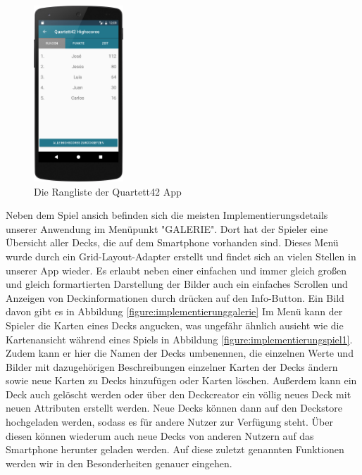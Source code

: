 \begin{figure}[htp]
	\centering
  	\includegraphics[width=0.3\textwidth]{img/screenshots/device_high_scores.png}
	\caption{Die Rangliste der Quartett42 App}
	\label{figure:implementierungrangliste}
\end{figure}

Neben dem Spiel ansich befinden sich die meisten Implementierungsdetails unserer Anwendung im Menüpunkt "GALERIE". Dort hat der Spieler eine Übersicht aller Decks, die auf dem Smartphone vorhanden sind. Dieses Menü wurde durch ein Grid-Layout-Adapter erstellt und findet sich an vielen Stellen in unserer App wieder. Es erlaubt neben einer einfachen und immer gleich großen und gleich formartierten Darstellung der Bilder auch ein einfaches Scrollen und Anzeigen von Deckinformationen durch drücken auf den Info-Button. Ein Bild davon gibt es in Abbildung \ref{figure:implementierunggalerie} Im Menü kann der Spieler die Karten eines Decks angucken, was ungefähr ähnlich ausieht wie die Kartenansicht während eines Spiels in Abbildung \ref{figure:implementierungspiel1}. Zudem kann er hier die Namen der Decks umbenennen, die einzelnen Werte und Bilder mit dazugehörigen Beschreibungen einzelner Karten der Decks ändern sowie neue Karten zu Decks hinzufügen oder Karten löschen. Außerdem kann ein Deck auch gelöscht werden oder über den Deckcreator ein völlig neues Deck mit neuen Attributen erstellt werden. Neue Decks können dann auf den Deckstore hochgeladen werden, sodass es für andere Nutzer zur Verfügung steht. Über diesen können wiederum auch neue Decks von anderen Nutzern auf das Smartphone herunter geladen werden. Auf diese zuletzt genannten Funktionen werden wir in den Besonderheiten genauer eingehen. 

